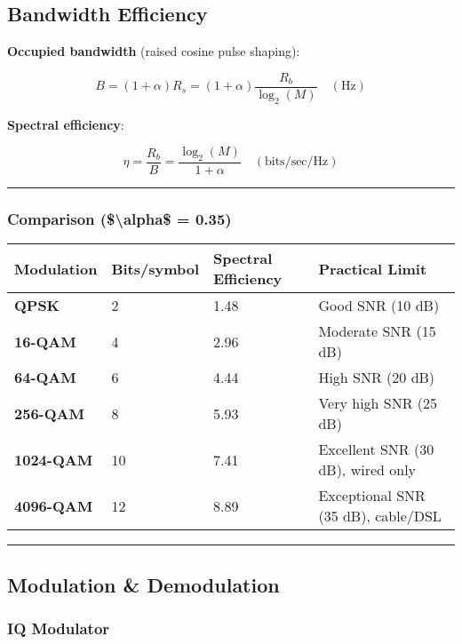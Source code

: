 \subsection{Bandwidth Efficiency}\label{bandwidth-efficiency}

\textbf{Occupied bandwidth} (raised cosine pulse shaping):

\[
B = (1 + \alpha) R_s = (1 + \alpha) \frac{R_b}{\log_2(M)} \quad (\text{Hz})
\]

\textbf{Spectral efficiency}:

\[
\eta = \frac{R_b}{B} = \frac{\log_2(M)}{1 + \alpha} \quad (\text{bits/sec/Hz})
\]

\begin{center}\rule{0.5\linewidth}{0.5pt}\end{center}

\subsubsection{Comparison (\$\textbackslash alpha\$ =
0.35)}\label{comparison-ux3b1-0.35}

{\def\LTcaptype{} %
\begin{longtable}[]{@{}llll@{}}
\toprule\noalign{}
Modulation & Bits/symbol & Spectral Efficiency & Practical Limit \\
\midrule\noalign{}
\endhead
\bottomrule\noalign{}
\endlastfoot
\textbf{QPSK} & 2 & 1.48 & Good SNR (10 dB) \\
\textbf{16-QAM} & 4 & 2.96 & Moderate SNR (15 dB) \\
\textbf{64-QAM} & 6 & 4.44 & High SNR (20 dB) \\
\textbf{256-QAM} & 8 & 5.93 & Very high SNR (25 dB) \\
\textbf{1024-QAM} & 10 & 7.41 & Excellent SNR (30 dB), wired only \\
\textbf{4096-QAM} & 12 & 8.89 & Exceptional SNR (35 dB), cable/DSL \\
\end{longtable}
}

\begin{center}\rule{0.5\linewidth}{0.5pt}\end{center}

\subsection{Modulation \& Demodulation}\label{modulation-demodulation}

\subsubsection{IQ Modulator}\label{iq-modulator}

